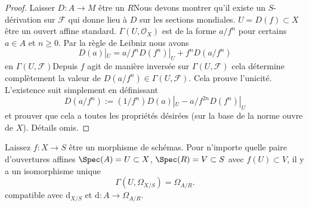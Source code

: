 \begin{proof}

Laisser $D : A \to M$ être un $R$Nous devons montrer qu'il existe un $S$-dérivation sur $\mathcal{F}$ qui donne lieu à
$D$ sur les sections mondiales. $U = D(f) \subset X$ être un ouvert affine standard. $\Gamma(U, \mathcal{O}_X)$ est de la forme
$a/f^n$ pour certains $a \in A$ et $n \geq 0$. Par la règle de Leibniz nous avons
$$
D(a)|_U = a/f^n D(f^n)|_U + f^n D(a/f^n)
$$
en $\Gamma(U, \mathcal{F})$Depuis $f$ agit de manière inversée sur $\Gamma(U, \mathcal{F})$ cela détermine complètement la valeur de $D(a/f^n) \in \Gamma(U, \mathcal{F})$. Cela prouve l'unicité. L'existence suit simplement en définissant
$$
D(a/f^n) := (1/f^n) D(a)|_U - a/f^{2n} D(f^n)|_U
$$
et prouver que cela a toutes les propriétés désirées (sur la base de la norme ouvre de $X$). Détails omis.

\end{proof}

\begin{lemma}

\label{lemma-differentials-affine}
Laissez $f : X \to S$ être un morphisme de schémas. Pour n'importe quelle paire d'ouvertures affines $\Spec(A) = U \subset X$, $\Spec(R) = V \subset S$ avec $f(U) \subset V$, il y a un isomorphisme unique $$
\Gamma(U, \Omega_{X/S}) = \Omega_{A/R}.
$$ compatible avec $\text{d}_{X/S}$ et $\text{d} : A \to \Omega_{A/R}$.
\end{lemma}

